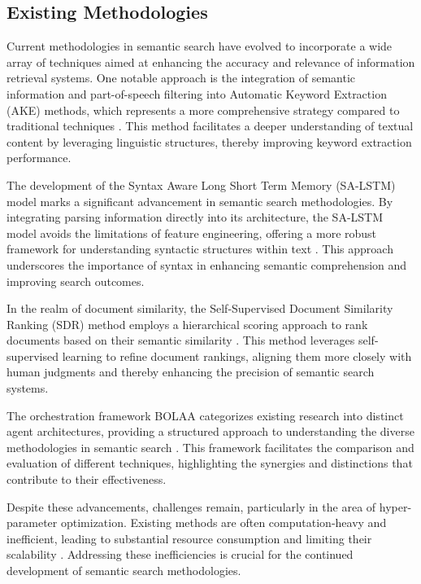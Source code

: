 \subsection{Existing Methodologies} \label{subsec:Existing Methodologies}

Current methodologies in semantic search have evolved to incorporate a wide array of techniques aimed at enhancing the accuracy and relevance of information retrieval systems. One notable approach is the integration of semantic information and part-of-speech filtering into Automatic Keyword Extraction (AKE) methods, which represents a more comprehensive strategy compared to traditional techniques \cite{altuncu2022improvingperformanceautomatickeyword}. This method facilitates a deeper understanding of textual content by leveraging linguistic structures, thereby improving keyword extraction performance.

The development of the Syntax Aware Long Short Term Memory (SA-LSTM) model marks a significant advancement in semantic search methodologies. By integrating parsing information directly into its architecture, the SA-LSTM model avoids the limitations of feature engineering, offering a more robust framework for understanding syntactic structures within text \cite{qian2017syntaxawarelstmmodel}. This approach underscores the importance of syntax in enhancing semantic comprehension and improving search outcomes.

In the realm of document similarity, the Self-Supervised Document Similarity Ranking (SDR) method employs a hierarchical scoring approach to rank documents based on their semantic similarity \cite{ginzburg2021selfsuperviseddocumentsimilarityranking}. This method leverages self-supervised learning to refine document rankings, aligning them more closely with human judgments and thereby enhancing the precision of semantic search systems.

The orchestration framework BOLAA categorizes existing research into distinct agent architectures, providing a structured approach to understanding the diverse methodologies in semantic search \cite{liu2023bolaabenchmarkingorchestratingllmaugmented}. This framework facilitates the comparison and evaluation of different techniques, highlighting the synergies and distinctions that contribute to their effectiveness.

Despite these advancements, challenges remain, particularly in the area of hyper-parameter optimization. Existing methods are often computation-heavy and inefficient, leading to substantial resource consumption and limiting their scalability \cite{shin2020hippotaminghyperparameteroptimization}. Addressing these inefficiencies is crucial for the continued development of semantic search methodologies.

